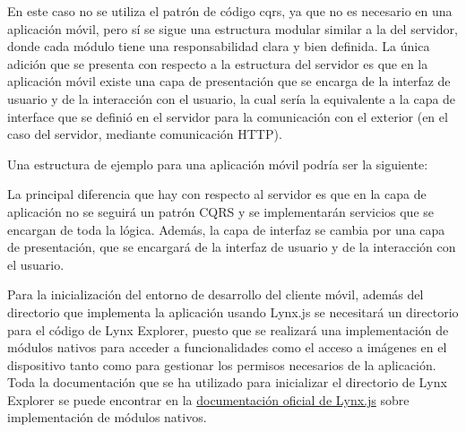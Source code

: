 En este caso no se utiliza el patrón de código \acrshort{cqrs}, ya que no es necesario en una aplicación móvil, pero sí se sigue una estructura modular similar a la del servidor, donde cada módulo tiene una responsabilidad clara y bien definida.
La única adición que se presenta con respecto a la estructura del servidor es que en la aplicación móvil existe una capa de presentación que se encarga de la interfaz de usuario y de la interacción con el usuario, la cual sería la equivalente a la capa de interface que se definió en el servidor para la comunicación con el exterior (en el caso del servidor, mediante comunicación HTTP).

Una estructura de ejemplo para una aplicación móvil podría ser la siguiente:


La principal diferencia que hay con respecto al servidor es que en la capa de aplicación no se seguirá un patrón CQRS y se implementarán servicios que se encargan de toda la lógica.
Además, la capa de interfaz se cambia por una capa de presentación, que se encargará de la interfaz de usuario y de la interacción con el usuario.

Para la inicialización del entorno de desarrollo del cliente móvil, además del directorio que implementa la aplicación usando Lynx.js se necesitará un directorio para el código de Lynx Explorer, puesto que se realizará una implementación de módulos nativos para acceder a funcionalidades como el acceso a imágenes en el dispositivo tanto como para gestionar los permisos necesarios de la aplicación.
Toda la documentación que se ha utilizado para inicializar el directorio de Lynx Explorer se puede encontrar en la \href{https://lynxjs.org/guide/use-native-modules.html#platform=android}{documentación oficial de Lynx.js} sobre implementación de módulos nativos.





